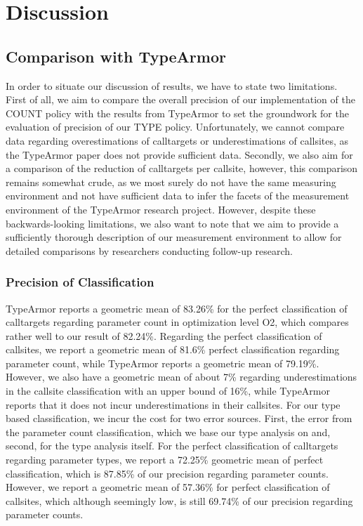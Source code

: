 
\section{Discussion}
\label{chapter:Discussion}

\subsection{Comparison with TypeArmor}
\label{section:comptype}
In order to situate our discussion of results, we have to state two limitations. First of all, we aim to compare the overall precision of our implementation of the COUNT policy with the results from TypeArmor to set the groundwork for the evaluation of precision of our TYPE policy. Unfortunately, we cannot compare data regarding overestimations of calltargets or underestimations of callsites, as the TypeArmor paper does not provide sufficient data. Secondly, we also aim for a comparison of the reduction of calltargets per callsite, however, this comparison remains somewhat crude, as we most surely do not have the same measuring environment and not have sufficient data to infer the facets of the measurement environment of the TypeArmor research project. However, despite these backwards-looking limitations, we also want to note that we aim to provide a sufficiently thorough description of our measurement environment to allow for detailed comparisons by researchers conducting follow-up research.

\subsubsection{Precision of Classification}
TypeArmor reports a geometric mean of 83.26\% for the perfect classification of calltargets regarding parameter count in optimization level O2, which compares rather well to our result of 82.24\%. Regarding the perfect classification of callsites, we report a geometric mean of 81.6\% perfect classification regarding parameter count, while TypeArmor reports a geometric mean of 79.19\%. However, we also have a geometric mean of about 7\% regarding underestimations in the callsite classification with an upper
bound of 16\%, while TypeArmor reports that it does not incur underestimations in their callsites. For our type based classification, we incur the cost for two error sources. First, the error from the parameter count classification, which we base our type analysis on and, second, for the type analysis itself. For the perfect classification of calltargets regarding parameter types, we report a 72.25\% geometric mean of perfect classification, which is 87.85\% of our precision regarding parameter
counts. However, we report a geometric mean of 57.36\% for perfect classification of callsites, which although seemingly low, is still 69.74\% of our precision regarding parameter counts.


